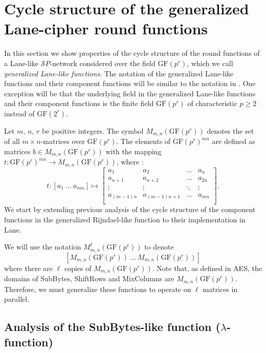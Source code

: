 \documentclass[11pt]{amsart}
\newcommand{\GF}{\mathrm{GF}}
\begin{document}
\section{Cycle structure of the generalized Lane-cipher round functions}
In this section we show properties of the cycle structure of the round functions of a Lane-like $\mathcal SP$-network considered over the field $\GF(p^r)$, which we call \emph {generalized  Lane-like functions}. The notation of the generalized Lane-like functions  and their component functions will be similar to the notation in \cite {SW}. One exception will be that the underlying field in the generalized Lane-like functions and their component functions is the finite field  $\GF(p^r)$ of characteristic $p\geq 2$ instead of $\GF(2^r)$.

Let $m,\,n,\,r $ be positive integers. The symbol $M_{m,n}(\GF(p^r))$ denotes the set of all $m\times n$-matrices over $\GF(p^r)$. The elements of $\GF(p^r)^{mn}$ are defined as matrices $b\in M_{m,n}(\GF(p^r))$ with the mapping $t:\GF(p^r)^{mn}\rightarrow M_{m,n}(\GF(p^r))$, where :
\[
t : [a_1~ \dots~ a_{mn}] \mapsto 
\left[
\begin{array}{ccccc}
a_1 & a_2 & \dots & a_{n} \\
a_{n+1} & a_{n+2} & \dots & a_{2n} \\
\vdots & \vdots & \ddots & \vdots \\
a_{(m-1)n} & a_{(m-1)n + 1} & \dots & a_{mn} \\
\end{array}
\right ].
\]
We start by extending previous analysis of the cycle structure of the component functions in the generalized Rijndael-like function to their implementation in Lane.

We will use the notation $M^{\ell}_{m,n}(\GF(p^r))$ to denote
$$[M_{m,n}(\GF(p^r)) ~ \dots ~ M_{m,n}(\GF(p^r))]$$
where there are $\ell$ copies of $M_{m,n}(\GF(p^r))$. Note that, as defined in AES, the domains of SubBytes, ShiftRows and MixColumns are $M_{m,n}(\GF(p^r))$. Therefore, we must generalize these functions to operate on $\ell$ matrices in parallel.
\vspace{0.2in}



\subsection{{\bf Analysis of the SubBytes-like function } ($\lambda$-function)}
\end{document}
